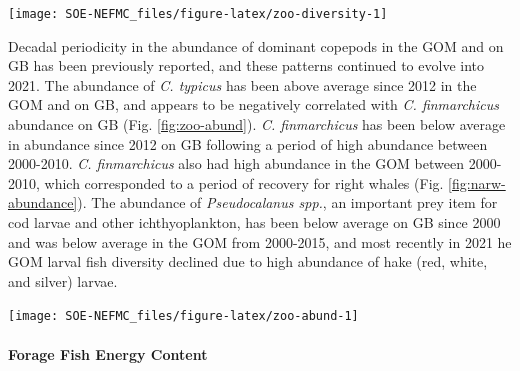 \documentclass[
  10pt,
]{article}
\let\origfigure\figure
\let\endorigfigure\endfigure
\renewenvironment{figure}[1][2] {
    \expandafter\origfigure\expandafter[H]
} {
    \endorigfigure
}
\begin{document}
\begin{figure}

{\centering \texttt{[image: SOE-NEFMC\_files/figure-latex/zoo-diversity-1]} 

}

\caption{Zooplankton community diversity for Georges Bank (GB) and the Gulf of Maine (GOM).}\label{fig:zoo-diversity}
\end{figure}

Decadal periodicity in the abundance of dominant copepods in the GOM and on GB has been previously reported, and these patterns continued to evolve into 2021. The abundance of \emph{C. typicus} has been above average since 2012 in the GOM and on GB, and appears to be negatively correlated with \emph{C. finmarchicus} abundance on GB (Fig. \ref{fig:zoo-abund}). \emph{C. finmarchicus} has been below average in abundance since 2012 on GB following a period of high abundance between 2000-2010. \emph{C. finmarchicus} also had high abundance in the GOM between 2000-2010, which corresponded to a period of recovery for right whales (Fig. \ref{fig:narw-abundance}). The abundance of \emph{Pseudocalanus spp.}, an important prey item for cod larvae and other ichthyoplankton, has been below average on GB since 2000 and was below average in the GOM from 2000-2015, and most recently in 2021 he GOM larval fish diversity declined due to high abundance of hake (red, white, and silver) larvae.

\begin{figure}

{\centering \texttt{[image: SOE-NEFMC\_files/figure-latex/zoo-abund-1]} 

}

\caption{Abundance Annomalies of three dominante zooplankton (\textit{Calanus finmarchicus}, \textit{Calanus typicus}, and \textit{Pseudocalanus spp}.) on Georges Bank (GB) and the Gulf of Maine (GOM).}\label{fig:zoo-abund}
\end{figure}

\hypertarget{forage-fish-energy-content}{%
\paragraph{Forage Fish Energy Content}\label{forage-fish-energy-content}}
\end{document}
